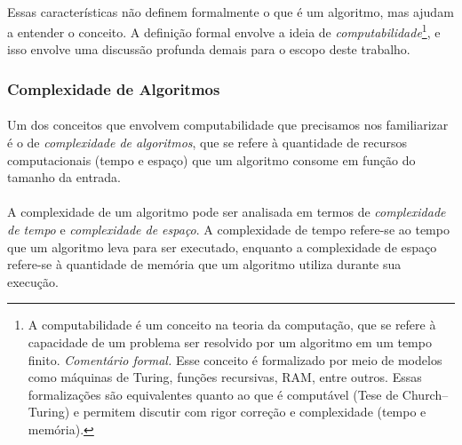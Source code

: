 \documentclass[12pt,a4paper]{article}
\begin{document}
\paragraph{}
Essas características não definem formalmente o que é um algoritmo, mas ajudam a entender o conceito. A definição formal envolve a ideia de \emph{computabilidade}\footnote{A computabilidade é um conceito na teoria da computação, que se refere à capacidade de um problema ser resolvido por um algoritmo em um tempo finito. \emph{Comentário formal.} Esse conceito é formalizado por meio de modelos como máquinas de Turing, funções recursivas, RAM, entre outros. Essas formalizações são equivalentes quanto ao que é computável (Tese de Church–Turing) e permitem discutir com rigor correção e complexidade (tempo e memória).}, e isso envolve uma discussão profunda demais para o escopo deste trabalho.

\subsubsection{Complexidade de Algoritmos}

\paragraph{}
Um dos conceitos que envolvem computabilidade que precisamos nos familiarizar é o de \emph{complexidade de algoritmos}, que se refere à quantidade de recursos computacionais (tempo e espaço) que um algoritmo consome em função do tamanho da entrada.

\paragraph{}
A complexidade de um algoritmo pode ser analisada em termos de \emph{complexidade de tempo} e \emph{complexidade de espaço}. A complexidade de tempo refere-se ao tempo que um algoritmo leva para ser executado, enquanto a complexidade de espaço refere-se à quantidade de memória que um algoritmo utiliza durante sua execução.
\end{document}
